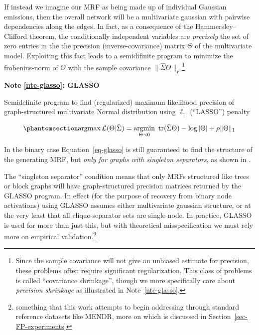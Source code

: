 \documentclass[%
	12pt,
		oneside,
		letterpaper
]{book}
\newcounter{quartocalloutnteno}
\newcommand{\quartocalloutnte}[1]{\refstepcounter{quartocalloutnteno}\label{#1}}
\begin{document}
If instead we imagine our MRF as being made up of individual Gaussian emissions, then the overall network will be a multivariate gaussian with pairwise dependencies along the edges.
In fact, as a consequence of the Hammersley--Clifford theorem, the conditionally independent variables are \emph{precisely} the set of zero entries in the the precision (inverse-covariance) matrix \(\Theta\) of the multivariate model.
Exploiting this fact leads to a semidifinite program to minimize the frobenius-norm of \(\Theta\) with the sample covariance \(\| \hat{\Sigma}\Theta \|_F\)\footnote{
  Since the sample covariance will not give an unbiased estimate for precision, these problems often require significant regularization.
  This class of problems is called ``covariance shrinkage'', though we more specifically care about \emph{precision shrinkage} as illustrated in Note~\ref{nte-glasso}.}

\begin{tcolorbox}[enhanced jigsaw, bottomrule=.15mm, colback=white, breakable, toprule=.15mm, colframe=quarto-callout-note-color-frame, leftrule=.75mm, arc=.35mm, opacityback=0, rightrule=.15mm, left=2mm]

\quartocalloutnte{nte-glasso} 

\vspace{-3mm}\textbf{Note \ref*{nte-glasso}: GLASSO}\vspace{3mm}

Semidefinite program to find (regularized) maximum likelihood precision of graph-structured multivariate Normal distribution using \(\ell_1\) (``LASSO'') penalty \autocite{Sparseinversecovariance_Friedman2008}

\begin{equation}\phantomsection\label{eq-glasso}{
\operatorname*{argmax} \mathcal{L}(\Theta|\hat{\Sigma})
  = \operatorname*{argmin}_{\Theta \prec 0}\ \text{tr}(\hat{\Sigma} \Theta) - \log |\Theta|+ \rho\|\Theta\|_1
}\end{equation}

In the binary case Equation~\ref{eq-glasso} is still guaranteed to find the structure of the generating MRF, but \emph{only for graphs with singleton separators}, as shown in \textcite{Structureestimationdiscrete_Loh2012}.

\end{tcolorbox}

The ``singleton separator'' condition means that only MRFs structured like trees or block graphs will have graph-structured precision matrices returned by the GLASSO program.
In effect (for the purpose of recovery from binary node activations) using GLASSO assumes either multivariate gaussian structure, or at the very least that all clique-separator sets are single-node.
In practice, GLASSO is used for more than just this, but with theoretical misspecification we must rely more on empirical validation.\footnote{
  something that this work attempts to begin addressing through standard reference datasets like MENDR, more on which is discussed in Section~\ref{sec-FP-experiments}}
\end{document}
